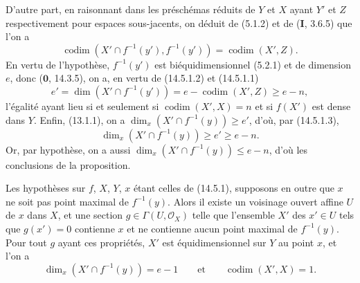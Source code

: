 D'autre part, en raisonnant dans les préschémas réduits de $Y$ et $X$ ayant $Y'$
et $Z$ respectivement pour espaces sous-jacents, on déduit de (5.1.2) et de
(\textbf{I}, 3.6.5) que l'on a
\begin{equation}
  \operatorname{codim}(X'\cap f^{-1}(y'),f^{-1}(y'))=\operatorname{codim}(X',Z).
  \tag{14.5.1.2}\label{IV.14.5.1.2-fr}
\end{equation}
En vertu de l'hypothèse, $f^{-1}(y')$ est biéquidimensionnel (5.2.1) et de
dimension $e$, donc ($\mathbf 0$, 14.3.5), on a, en vertu de (14.5.1.2) et
(14.5.1.1)
\begin{equation}
  e'=\dim(X'\cap f^{-1}(y'))=e-\operatorname{codim}(X',Z)\geq e-n,
  \tag{14.5.1.3}\label{IV.14.5.1.3-fr}
\end{equation}
l'égalité ayant lieu si et seulement si $\operatorname{codim}(X',X)=n$ et si $f(X')$ est dense
dans $Y$. Enfin, (13.1.1), on a $\dim_x(X'\cap f^{-1}(y))\geq e'$, d'où, par
(14.5.1.3),
\begin{equation}
  \dim_x(X'\cap f^{-1}(y))\geq e'\geq e-n.
  \tag{14.5.1.4}\label{IV.14.5.1.4-fr}
\end{equation}
Or, par hypothèse, on a aussi $\dim_x(X'\cap f^{-1}(y))\leq e-n$, d'où les
conclusions de la proposition.

\begin{corollary}[14.5.2]
\label{IV.14.5.2-fr}
Les hypothèses sur $f$, $X$, $Y$, $x$ étant celles de (14.5.1), supposons en
outre que $x$ ne soit pas point maximal de $f^{-1}(y)$. Alors il existe un
voisinage ouvert affine $U$ de $x$ dans $X$, et une section
$g\in\Gamma(U,\mathcal O_X)$ telle que l'ensemble $X'$ des $x'\in U$ tels que
$g(x')=0$ contienne $x$ et ne contienne aucun point maximal de $f^{-1}(y)$. Pour
tout $g$ ayant ces propriétés, $X'$ est équidimensionnel sur $Y$ au point $x$, et
l'on a
\begin{equation}
  \dim_x(X'\cap f^{-1}(y))=e-1 \qquad\text{et}\qquad \operatorname{codim}(X',X)=1.
  \tag{14.5.2.1}\label{IV.14.5.2.1-fr}
\end{equation}
\end{corollary}

